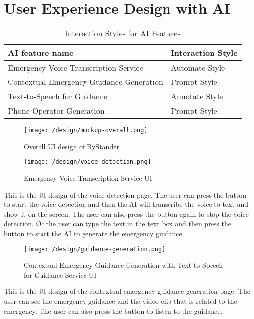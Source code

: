 \section{User Experience Design with AI}
\label{sec:user_experience_design_ai}

\begin{table}[h!]
\centering
\caption{Interaction Styles for AI Features}
\label{tab:interaction_styles}
\begin{tabular}{|l|l|}
\hline
\textbf{AI feature name} & \textbf{Interaction Style} \\
\hline
Emergency Voice Transcription Service & Automate Style \\
\hline
Contextual Emergency Guidance Generation & Prompt Style \\
\hline
Text-to-Speech for Guidance & Annotate Style \\
\hline
Phone Operator Generation & Prompt Style \\
\hline
\end{tabular}
\end{table}

\begin{figure}[h]
    \centering
    \texttt{[image: /design/mockup-overall.png]}
    \caption{Overall UI design of ByStander}
\end{figure}
\medskip %

\begin{figure}[h]
    \centering
    \texttt{[image: /design/voice-detection.png]}
    \caption{Emergency Voice Transcription Service UI}
\end{figure}
This is the UI design of the voice detection page. The user can press the button to start the voice detection and then the AI will transcribe the voice to text and show it on the screen. The user can also press the button again to stop the voice detection.
Or the user can type the text in the text box and then press the button to start the AI to generate the emergency guidance.

\begin{figure}[h]
    \centering
    \texttt{[image: /design/guidance-generation.png]}
    \caption{Contextual Emergency Guidance Generation with Text-to-Speech for Guidance Service UI}
\end{figure}
This is the UI design of the contextual emergency guidance generation page. The user can see the emergency guidance and the video clip that is related to the emergency. 
The user can also press the button to listen to the guidance.

